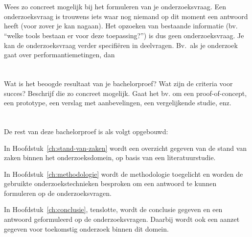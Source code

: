 \section{}
\label{sec:onderzoeksvraag}

Wees zo concreet mogelijk bij het formuleren van je onderzoeksvraag. Een onderzoeksvraag is trouwens iets waar nog niemand op dit moment een antwoord heeft (voor zover je kan nagaan). Het opzoeken van bestaande informatie (bv. ``welke tools bestaan er voor deze toepassing?'') is dus geen onderzoeksvraag. Je kan de onderzoeksvraag verder specifiëren in deelvragen. Bv.~als je onderzoek gaat over performantiemetingen, dan 

\section{}
\label{sec:onderzoeksdoelstelling}

Wat is het beoogde resultaat van je bachelorproef? Wat zijn de criteria voor succes? Beschrijf die zo concreet mogelijk. Gaat het bv. om een proof-of-concept, een prototype, een verslag met aanbevelingen, een vergelijkende studie, enz.

\section{}
\label{sec:opzet-bachelorproef}


De rest van deze bachelorproef is als volgt opgebouwd:

In Hoofdstuk~\ref{ch:stand-van-zaken} wordt een overzicht gegeven van de stand van zaken binnen het onderzoeksdomein, op basis van een literatuurstudie.

In Hoofdstuk~\ref{ch:methodologie} wordt de methodologie toegelicht en worden de gebruikte onderzoekstechnieken besproken om een antwoord te kunnen formuleren op de onderzoeksvragen.


In Hoofdstuk~\ref{ch:conclusie}, tenslotte, wordt de conclusie gegeven en een antwoord geformuleerd op de onderzoeksvragen. Daarbij wordt ook een aanzet gegeven voor toekomstig onderzoek binnen dit domein.